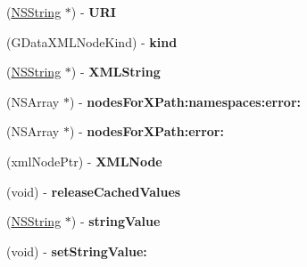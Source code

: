 \begin{DoxyCompactItemize}
\item 
\hypertarget{interface_g_data_x_m_l_node_a9d34ab47a4b5e1b3c67b26b07e9956a1}{
(\hyperlink{class_n_s_string}{NSString} $\ast$) -\/ {\bfseries URI}}
\label{interface_g_data_x_m_l_node_a9d34ab47a4b5e1b3c67b26b07e9956a1}

\item 
\hypertarget{interface_g_data_x_m_l_node_a5e033ccdae3236c8875e1c6feb44c949}{
(GDataXMLNodeKind) -\/ {\bfseries kind}}
\label{interface_g_data_x_m_l_node_a5e033ccdae3236c8875e1c6feb44c949}

\item 
\hypertarget{interface_g_data_x_m_l_node_a958c434d973db58ada939d7276977812}{
(\hyperlink{class_n_s_string}{NSString} $\ast$) -\/ {\bfseries XMLString}}
\label{interface_g_data_x_m_l_node_a958c434d973db58ada939d7276977812}

\item 
\hypertarget{interface_g_data_x_m_l_node_a93c2784d84fc245d99cf2943fc41c19c}{
(NSArray $\ast$) -\/ {\bfseries nodesForXPath:namespaces:error:}}
\label{interface_g_data_x_m_l_node_a93c2784d84fc245d99cf2943fc41c19c}

\item 
\hypertarget{interface_g_data_x_m_l_node_a48f3179efdba9b7e017aa32e7118907b}{
(NSArray $\ast$) -\/ {\bfseries nodesForXPath:error:}}
\label{interface_g_data_x_m_l_node_a48f3179efdba9b7e017aa32e7118907b}

\item 
\hypertarget{interface_g_data_x_m_l_node_a775ef8bdbcb26003bfd326930f028d44}{
(xmlNodePtr) -\/ {\bfseries XMLNode}}
\label{interface_g_data_x_m_l_node_a775ef8bdbcb26003bfd326930f028d44}

\item 
\hypertarget{interface_g_data_x_m_l_node_a71cb5af09b5c6737c452f2e09bcdec36}{
(void) -\/ {\bfseries releaseCachedValues}}
\label{interface_g_data_x_m_l_node_a71cb5af09b5c6737c452f2e09bcdec36}

\item 
\hypertarget{interface_g_data_x_m_l_node_ad6cef8a7c9c6714b8ea42e2620f86866}{
(\hyperlink{class_n_s_string}{NSString} $\ast$) -\/ {\bfseries stringValue}}
\label{interface_g_data_x_m_l_node_ad6cef8a7c9c6714b8ea42e2620f86866}

\item 
\hypertarget{interface_g_data_x_m_l_node_ab3b73dcb1ac9607325552747a3055a1e}{
(void) -\/ {\bfseries setStringValue:}}
\label{interface_g_data_x_m_l_node_ab3b73dcb1ac9607325552747a3055a1e}


\end{DoxyCompactItemize}
